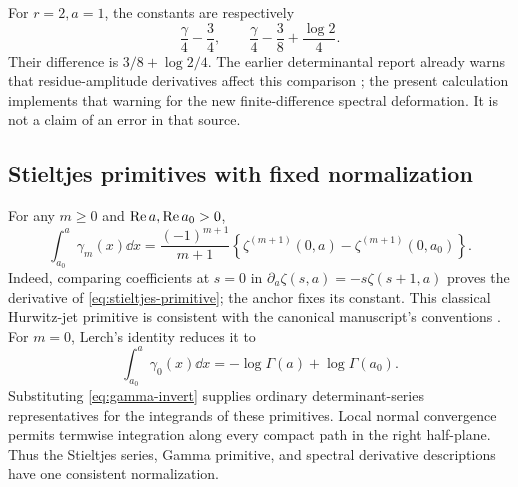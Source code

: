 For $r=2,a=1$, the constants are respectively
\begin{equation}\label{eq:cutoff-example}
 \frac\gamma4-\frac34,
 \qquad
 \frac\gamma4-\frac38+\frac{\log2}{4}.
\end{equation}
Their difference is $3/8+\log2/4$. The earlier determinantal report
already warns that residue-amplitude derivatives affect this comparison
\cite{repo:dhr}; the present calculation implements that warning for the
new finite-difference spectral deformation. It is not a claim of an error
in that source.

\subsection{Stieltjes primitives with fixed normalization}
For any $m\ge0$ and $\operatorname{Re} a,\operatorname{Re} a_0>0$,
\begin{equation}\label{eq:stieltjes-primitive}
 \int_{a_0}^a\gamma_m(x)\dd x
 =\frac{(-1)^{m+1}}{m+1}
    \left\{\zeta^{(m+1)}(0,a)-\zeta^{(m+1)}(0,a_0)\right\}.
\end{equation}
Indeed, comparing coefficients at $s=0$ in
$\partial_a\zeta(s,a)=-s\zeta(s+1,a)$ proves the derivative of
\eqref{eq:stieltjes-primitive}; the anchor fixes its constant. This
classical Hurwitz-jet primitive is consistent with the canonical
manuscript's conventions \cite{repo:integration,dlmf:hurwitz}.
For $m=0$, Lerch's identity reduces it to
\[
 \int_{a_0}^a\gamma_0(x)\dd x=-\log\Gamma(a)+\log\Gamma(a_0).
\]
Substituting \eqref{eq:gamma-invert} supplies ordinary determinant-series
representatives for the integrands of these primitives. Local normal
convergence permits termwise integration along every compact path in
the right half-plane. Thus the Stieltjes series, Gamma primitive, and
spectral derivative descriptions have one consistent normalization.
